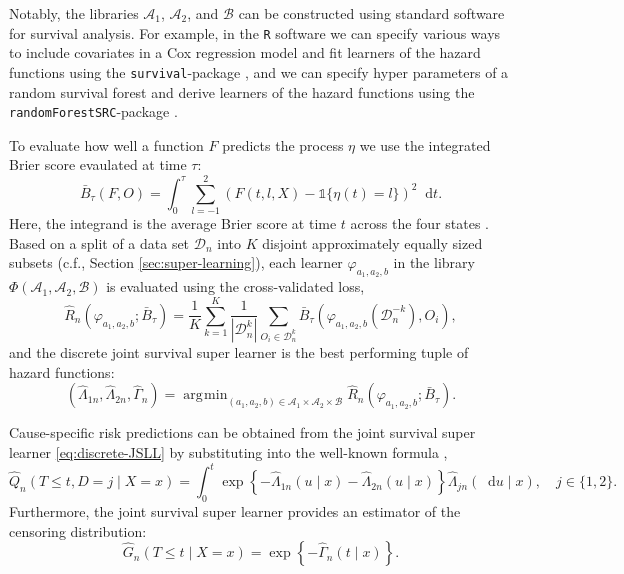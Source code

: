 \documentclass[a4paper,danish]{article}
\renewcommand{\phi}{\varphi}
\newcommand*\diff{\mathop{}\!\mathrm{d}}
\newcommand{\1}{\mathds{1}}
\DeclareMathOperator*{\argmin}{\arg\!\min}
\newcommand{\data}{\ensuremath{\mathcal{D}}}
\theoremstyle{plain} %
\numberwithin{theorem}{section}
\theoremstyle{definition} %
\theoremstyle{remark}
\begin{document}
  Notably, the libraries \( \mathcal{A}_1 \), \(
\mathcal{A}_2 \), and \( \mathcal{B} \) can be constructed using
standard software for survival analysis.  For example, in the
\texttt{R} software we can specify various ways to include covariates
in a Cox regression model and fit learners of the hazard functions
using the \texttt{survival}-package \citep{survival-package}, and we
can specify hyper parameters of a random survival forest and derive
learners of the hazard functions using the
\texttt{randomForestSRC}-package \citep{randomForestSRC}.

To evaluate how well a function \( F \) predicts the
process $\eta$ we use the integrated Brier score \citep{graf1999assessment}
evaulated at time \(\tau\):
\begin{equation*}
  \bar B_\tau(F,O) = \int_0^{\tau} \sum_{l=-1}^{2}
  \left(
      F(t,l,X) - \1{\{\eta(t)=l\}}
  \right)^2\diff t.
\end{equation*}
Here, the integrand is the average Brier score at time \(t\) across
the four states \citep{brier1950verification}. Based on a split of a
data set \(\data_n\) into $K$ disjoint approximately equally sized
subsets (c.f., Section \ref{sec:super-learning}), each learner \(
\phi_{a_1, a_2, b} \) in the library \( \Phi(\mathcal{A}_1,
\mathcal{A}_2, \mathcal{B}) \) is evaluated using the cross-validated
loss,
\begin{equation*}
  \hat{R}_{n}(\phi_{a_1,a_2,b} ; \bar{B}_{\tau}) =
  \frac{1}{K}\sum_{k=1}^{K}
  \frac{1}{| \data_n^{k} |}\sum_{O_i \in \data_n^{k}}
  \bar B_\tau
  {
    \left(
      \phi_{a_1,a_2,b}{ (\data_n^{-k})}
      , O_i
    \right)
  },
\end{equation*}
and the discrete joint survival super learner is the best performing tuple of hazard functions:
\begin{equation}\label{eq:discrete-JSLL}
  (\hat \Lambda_{1n},\hat \Lambda_{2n}, \hat \Gamma_{n})
  =  \argmin_{(a_1,a_2,b)\in \mathcal{A}_1\times\mathcal{A}_2\times\mathcal{B}}
    \hat{R}_{n}(\phi_{a_1,a_2,b} ; \bar{B}_{\tau}).
\end{equation}
  
Cause-specific risk predictions can be obtained from
the joint survival super learner \eqref{eq:discrete-JSLL} by
substituting into the well-known formula
\citep[e.g.,][]{benichou1990estimates, ozenne2017riskregression},
\begin{equation}
  \label{eq:cs-risk-def} \hat Q_n(T \leq t, D = j \mid X=x) = \int_0^t
\exp\left\{-\hat\Lambda_{1n}(u \mid x)-\hat\Lambda_{2n}(u \mid
x)\right\} \hat\Lambda_{jn}(\diff u \mid x), \quad j \in \{1,2\}.
\end{equation} Furthermore, the joint survival super learner provides an
estimator of the censoring distribution:
\begin{equation*}
 \hat G_n(T \leq t \mid X=x) = \exp\left\{-\hat\Gamma_n(t \mid x)\right\}.
\end{equation*}
\end{document}
